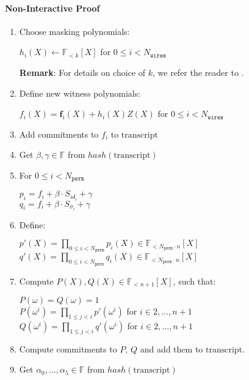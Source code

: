 \paragraph{Non-Interactive Proof}
\begin{enumerate}
	\item Choose masking polynomials: 
	\begin{center}
		$h_i(X) \leftarrow \mathbb{F}_{<k}[X]$ for $0 \leq i < N_{\texttt{wires}}$
	\end{center}
	\textbf{Remark}: For details on choice of $k$, we refer the reader to \cite{cryptoeprint:2019:1400}.
	\item Define new witness polynomials:
	\begin{center}
		$f_i(X) = \textbf{f}_{i}(X) + h_i(X)Z(X)$ for $0 \leq i < N_{\texttt{wires}}$
	\end{center}
	\item Add commitments to $f_i$ to $\text{transcript}$
	\item Get $\beta, \gamma \in \mathbb{F}$ from $hash(\text{transcript})$
	\item For $0 \leq i < N_{\texttt{perm}}$
	\begin{center}
		$p_i = f_i + \beta \cdot S_{id_i} + \gamma$ \\
		$q_i = f_i + \beta \cdot S_{\sigma_i} + \gamma$
	\end{center}
	\item Define:
	\begin{center}
		$p'(X) = \prod\limits_{0 \leq i < N_{\texttt{perm}}} p_i(X) \in \mathbb{F}_{<N_{\texttt{perm}} \cdot n}[X]$ \\
		$q'(X) = \prod\limits_{0 \leq i < N_{\texttt{perm}}} q_i(X) \in \mathbb{F}_{<N_{\texttt{perm}} \cdot n}[X]$
	\end{center}
	\item Compute $P(X), Q(X) \in \mathbb{F}_{<n+1}[X]$, such that:
	\begin{center}
		$P(\omega) = Q(\omega) = 1$ \\
		$P(\omega^i) = \prod\limits_{1 \leq j < i}p'(\omega^i)$ for $i \in {2, \dots, n + 1}$ \\
		$Q(\omega^i) = \prod\limits_{1 \leq j < i}q'(\omega^i)$ for $i \in {2, \dots, n + 1}$ \\
	\end{center}
	\item Compute commitments to $P$, $Q$ and add them to $\text{transcript}$.
	\item Get $\alpha_0, \dots, \alpha_5 \in \mathbb{F}$ from $hash(\text{transcript})$

\end{enumerate}
